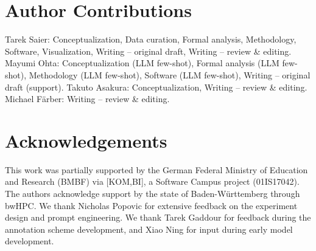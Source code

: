 

\section*{Author Contributions}  %
Tarek Saier: Conceptualization, Data curation, Formal analysis, Methodology, Software, Visualization, Writing -- original draft, Writing -- review \& editing. Mayumi Ohta: Conceptualization (LLM few-shot), Formal analysis (LLM few-shot), Methodology (LLM few-shot), Software (LLM few-shot), Writing -- original draft (support). Takuto Asakura: Conceptualization, Writing -- review \& editing. Michael F{\"a}rber: Writing -- review \& editing.

\section*{Acknowledgements}
This work was partially supported by the German Federal Ministry of Education and Research (BMBF) via [KOM,BI], a Software Campus project (01IS17042).
The authors acknowledge support by the state of Baden-W{\"u}rttemberg through bwHPC.
We thank Nicholas Popovic for extensive feedback on the experiment design and prompt engineering. We thank Tarek Gaddour for feedback during the annotation scheme development, and Xiao Ning for input during early model development.
